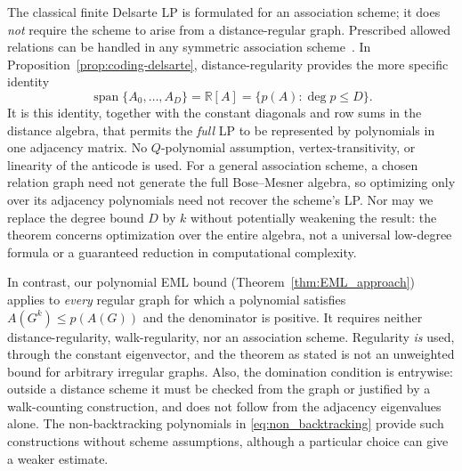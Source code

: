 \documentclass[10pt,a4paper]{article}
\theoremstyle{plain}
\numberwithin{equation}{section}
\def\1{\mbox{\boldmath $1$}}
\begin{document}

The classical finite Delsarte LP is formulated for an association scheme; it does \emph{not} require the scheme to arise from a distance-regular graph. Prescribed allowed relations can be handled in any symmetric association scheme~\cite{Delsarte_1973,Schrijver_1979}. In Proposition~\ref{prop:coding-delsarte}, distance-regularity provides the more specific identity
\[
 \operatorname{span}\{A_0,\ldots,A_D\}=\mathbb R[A]
   =\{p(A):\deg p\le D\}.
\]
It is this identity, together with the constant diagonals and row sums in the distance algebra, that permits the \emph{full} LP to be represented by polynomials in one adjacency matrix. No $Q$-polynomial assumption, vertex-transitivity, or linearity of the anticode is used. For a general association scheme, a chosen relation graph need not generate the full Bose--Mesner algebra, so optimizing only over its adjacency polynomials need not recover the scheme's LP. Nor may we replace the degree bound $D$ by $k$ without potentially weakening the result: the theorem concerns optimization over the entire algebra, not a universal low-degree formula or a guaranteed reduction in computational complexity.

In contrast, our polynomial EML bound (Theorem~\ref{thm:EML_approach}) applies to \emph{every} regular graph for which a polynomial satisfies $A(G^k)\le p(A(G))$ and the denominator is positive. It requires neither distance-regularity, walk-regularity, nor an association scheme. Regularity \emph{is} used, through the constant eigenvector, and the theorem as stated is not an unweighted bound for arbitrary irregular graphs. Also, the domination condition is entrywise: outside a distance scheme it must be checked from the graph or justified by a walk-counting construction, and does not follow from the adjacency eigenvalues alone. The non-backtracking polynomials in \eqref{eq:non_backtracking} provide such constructions without scheme assumptions, although a particular choice can give a weaker estimate.
\end{document}

